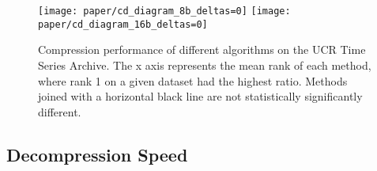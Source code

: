 \begin{figure}[h]
\begin{center}
    \texttt{[image: paper/cd\_diagram\_8b\_deltas=0]}
    \texttt{[image: paper/cd\_diagram\_16b\_deltas=0]}
    \caption{Compression performance of different algorithms on the UCR Time Series Archive. The x axis represents the mean rank of each method, where rank 1 on a given dataset had the highest ratio.  Methods joined with a horizontal black line are not statistically significantly different.}
    \label{fig:ratioCD}
\end{center}
\end{figure}







\subsection{Decompression Speed}

